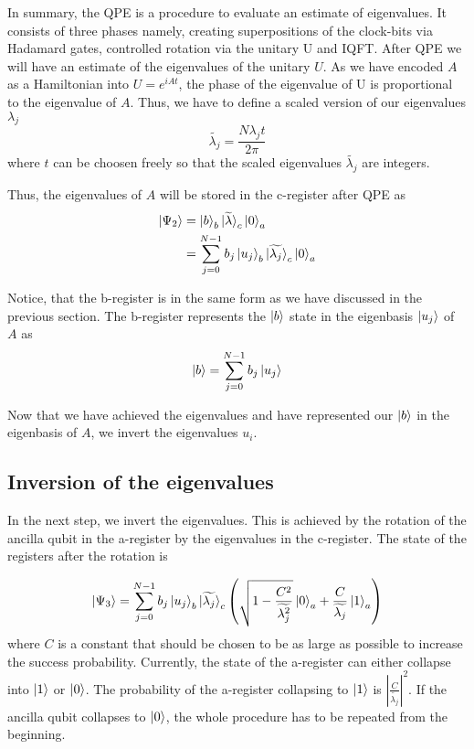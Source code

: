 In summary, the QPE is a procedure to evaluate an estimate of eigenvalues. 
It consists of three phases namely, creating superpositions of the clock-bits via Hadamard gates, controlled rotation via the unitary U and IQFT.
After QPE we will have an estimate of the eigenvalues of the unitary $U$. 
As we have encoded $A$ as a Hamiltonian into $U = e^{iAt}$, the phase of the eigenvalue of U is proportional to the eigenvalue of $A$.
Thus, we have to define a scaled version of our eigenvalues $\lambda_j$
\begin{equation}
\widetilde{\lambda_j} = \frac {N\lambda_jt}{2\pi}
\end{equation}
where $t$ can be choosen freely so that the scaled eigenvalues $\widetilde{\lambda_j}$ are integers.

Thus, the eigenvalues of $A$ will be stored in the c-register after QPE as
\begin{equation}
\begin{split}
\ket{\Psi_2} &= \ket{b}_b \ket{\widetilde{\lambda}}_c\ket{0}_a \\
& =\sum_{j=0}^{N-1} b_j \ket{u_j}_b \ket{\widetilde{\lambda_j}}_c \ket 0_a
\end{split}
\end{equation}

Notice, that the b-register is in the same form as we have discussed in the previous section. 
The b-register represents the $\ket b$ state in the eigenbasis $\ket{u_j}$ of $A$ as
\begin{equation}
\ket{b} = \sum_{j=0}^{N-1} b_j\ket{u_j}
\end{equation}

Now that we have achieved the eigenvalues and have represented our $\ket{b}$ in the eigenbasis of $A$, we invert the eigenvalues $u_i$.


\subsection{Inversion of the eigenvalues}
In the next step, we invert the eigenvalues.
This is achieved by the rotation of the ancilla qubit in the a-register by the eigenvalues in the c-register.
The state of the registers after the rotation is

\begin{equation}
\ket{\Psi_3} = \sum_{j=0}^{N-1} b_j \ket{u_j}_b {\ket{\widetilde{\lambda_j}}}_c \left(\sqrt{1-\frac{C^2}{\widetilde{\lambda_j^2}}}\ket{0}_a + \frac{C}{\widetilde{\lambda_j}} \ket{1}_a\right)
\end{equation}
where $C$ is a constant that should be chosen to be as large as possible to increase the success probability.
Currently, the state of the a-register can either collapse into $\ket 1$ or $\ket 0$. 
The probability of the a-register collapsing to $\ket 1$ is $\left|\frac C {\widetilde{\lambda_j}}\right|^2$.
If the ancilla qubit collapses to $\ket 0$, the whole procedure has to be repeated from the beginning. 

